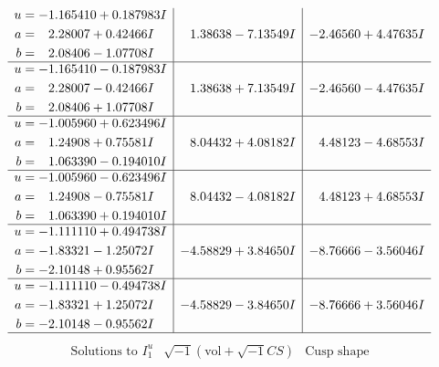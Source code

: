 \documentclass[1p]{elsarticle_modified}
\theoremstyle{definition}
\newcommand{\I}{\sqrt{-1}}
\begin{document}
$$\begin{array}{c|c|c}
\begin{aligned}
u &= -1.165410 + 0.187983 I \\
a &= \phantom{-}2.28007 + 0.42466 I \\
b &= \phantom{-}2.08406 - 1.07708 I\end{aligned}
 & \phantom{-}1.38638 - 7.13549 I & -2.46560 + 4.47635 I \\ \hline\begin{aligned}
u &= -1.165410 - 0.187983 I \\
a &= \phantom{-}2.28007 - 0.42466 I \\
b &= \phantom{-}2.08406 + 1.07708 I\end{aligned}
 & \phantom{-}1.38638 + 7.13549 I & -2.46560 - 4.47635 I \\ \hline\begin{aligned}
u &= -1.005960 + 0.623496 I \\
a &= \phantom{-}1.24908 + 0.75581 I \\
b &= \phantom{-}1.063390 - 0.194010 I\end{aligned}
 & \phantom{-}8.04432 + 4.08182 I & \phantom{-}4.48123 - 4.68553 I \\ \hline\begin{aligned}
u &= -1.005960 - 0.623496 I \\
a &= \phantom{-}1.24908 - 0.75581 I \\
b &= \phantom{-}1.063390 + 0.194010 I\end{aligned}
 & \phantom{-}8.04432 - 4.08182 I & \phantom{-}4.48123 + 4.68553 I \\ \hline\begin{aligned}
u &= -1.111110 + 0.494738 I \\
a &= -1.83321 - 1.25072 I \\
b &= -2.10148 + 0.95562 I\end{aligned}
 & -4.58829 + 3.84650 I & -8.76666 - 3.56046 I \\ \hline\begin{aligned}
u &= -1.111110 - 0.494738 I \\
a &= -1.83321 + 1.25072 I \\
b &= -2.10148 - 0.95562 I\end{aligned}
 & -4.58829 - 3.84650 I & -8.76666 + 3.56046 I\\
 \hline 
 \end{array}$$\newpage$$\begin{array}{c|c|c}  
\text{Solutions to }I^u_{1}& \I (\text{vol} + \sqrt{-1}CS) & \text{Cusp shape}\\
 \hline 
\begin{aligned}

\end{aligned}
\end{array}$$
\end{document}
